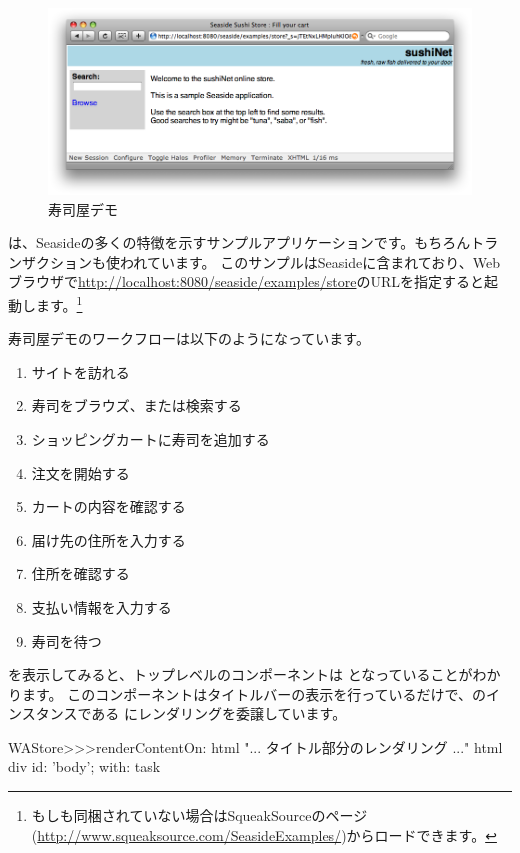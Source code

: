 \documentclass[a4paper,10pt,twoside]{book}
\begin{document}
\begin{figure}[ht]
\begin{center}
\includegraphics[width=\textwidth]{sushiStore}
\caption{寿司屋デモ}
\end{center}
\end{figure}

 は、Seasideの多くの特徴を示すサンプルアプリケーションです。もちろんトランザクションも使われています。
このサンプルはSeasideに含まれており、Webブラウザで\url{http://localhost:8080/seaside/examples/store}のURLを指定すると起動します。\footnote{もしも同梱されていない場合はSqueakSourceのページ(\url{http://www.squeaksource.com/SeasideExamples/})からロードできます。 }

寿司屋デモのワークフローは以下のようになっています。
\begin{enumerate}[itemsep=0pt]
  \item サイトを訪れる
  \item 寿司をブラウズ、または検索する
  \item ショッピングカートに寿司を追加する
  \item 注文を開始する
  \item カートの内容を確認する
  \item 届け先の住所を入力する
  \item 住所を確認する
  \item 支払い情報を入力する
  \item 寿司を待つ
\end{enumerate}

を表示してみると、トップレベルのコンポーネントは となっていることがわかります。
このコンポーネントはタイトルバーの表示を行っているだけで、のインスタンスである にレンダリングを委譲しています。

\begin{code}{}
WAStore>>>renderContentOn: html
	"... タイトル部分のレンダリング ..."
	html div id: 'body'; with: task
\end{code}
\end{document}
